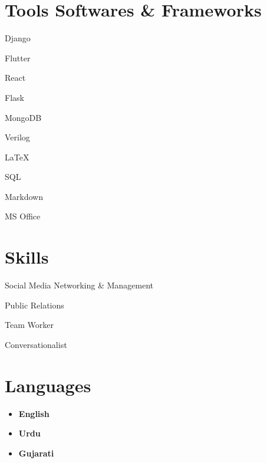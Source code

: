 \documentclass[]{resume}
\begin{document}
\begin{minipage}[t]{0.39\textwidth} 




\section{Tools Softwares \& Frameworks}
\begin{multicols}{2}
\begin{tightemize}
        \item Django
        \item Flutter
        \item React
        \item Flask
        \item MongoDB
        \columnbreak
        \item Verilog
        \item \LaTeX
        \item SQL
        \item Markdown
        \item MS Office
    \end{tightemize}
\end{multicols}

\section{Skills}
\begin{tightemize}
\sectionsep
        \item Social Media Networking \& Management
        \item Public Relations
        \item Team Worker
        \item Conversationalist
    \end{tightemize}



\section{Languages}
\begin{multicols}{3}
\begin{itemize}
        \item \textbf{English}
        \columnbreak
        \item \textbf{Urdu}
        \columnbreak
        \item \textbf{Gujarati}
    \end{itemize}
\end{multicols}


\end{minipage}
\end{document}
